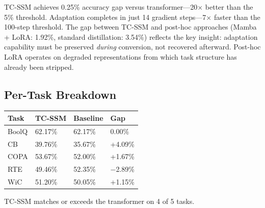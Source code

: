 TC-SSM achieves 0.25\% accuracy gap versus transformer---20$\times$ better than the 5\% threshold. Adaptation completes in just 14 gradient steps---7$\times$ faster than the 100-step threshold. The gap between TC-SSM and post-hoc approaches (Mamba + LoRA: 1.92\%, standard distillation: 3.54\%) reflects the key insight: adaptation capability must be preserved \textit{during} conversion, not recovered afterward. Post-hoc LoRA operates on degraded representations from which task structure has already been stripped.

\subsection{Per-Task Breakdown}

\begin{table}[h]
\centering
\begin{tabular}{@{}llll@{}}
\toprule
Task & TC-SSM & Baseline & Gap \\
\midrule
BoolQ & 62.17\% & 62.17\% & 0.00\% \\
CB & 39.76\% & 35.67\% & +4.09\% \\
COPA & 53.67\% & 52.00\% & +1.67\% \\
RTE & 49.46\% & 52.35\% & $-$2.89\% \\
WiC & 51.20\% & 50.05\% & +1.15\% \\
\bottomrule
\end{tabular}
\end{table}

TC-SSM matches or exceeds the transformer on 4 of 5 tasks.
